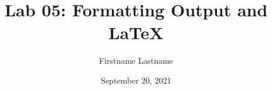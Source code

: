\newcommand{\course}{MATH 3341}
\title{Lab 05: Formatting Output and \LaTeX{}}
\author{Firstname Lastname}
\date{September 20, 2021}

